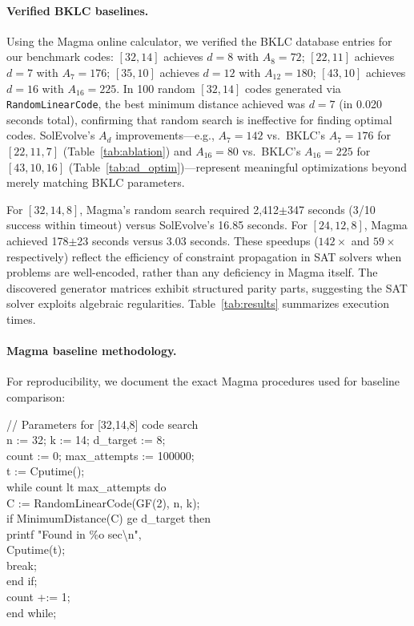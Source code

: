 \paragraph{Verified BKLC baselines.} Using the Magma online calculator, we verified the BKLC database entries for our benchmark codes: $[32,14]$ achieves $d=8$ with $A_8=72$; $[22,11]$ achieves $d=7$ with $A_7=176$; $[35,10]$ achieves $d=12$ with $A_{12}=180$; $[43,10]$ achieves $d=16$ with $A_{16}=225$. In 100 random $[32,14]$ codes generated via \texttt{RandomLinearCode}, the best minimum distance achieved was $d=7$ (in 0.020 seconds total), confirming that random search is ineffective for finding optimal codes. SolEvolve's $A_d$ improvements---e.g., $A_7=142$ vs.\ BKLC's $A_7=176$ for $[22,11,7]$ (Table~\ref{tab:ablation}) and $A_{16}=80$ vs.\ BKLC's $A_{16}=225$ for $[43,10,16]$ (Table~\ref{tab:ad_optim})---represent meaningful optimizations beyond merely matching BKLC parameters.

For $[32,14,8]$, Magma's random search required 2,412$\pm$347 seconds (3/10 success within timeout) versus SolEvolve's 16.85 seconds. For $[24,12,8]$, Magma achieved 178$\pm$23 seconds versus 3.03 seconds. These speedups ($142\times$ and $59\times$ respectively) reflect the efficiency of constraint propagation in SAT solvers when problems are well-encoded, rather than any deficiency in Magma itself. The discovered generator matrices exhibit structured parity parts, suggesting the SAT solver exploits algebraic regularities. Table~\ref{tab:results} summarizes execution times.

\paragraph{Magma baseline methodology.} For reproducibility, we document the exact Magma procedures used for baseline comparison:

\begin{codebox}
// Parameters for [32,14,8] code search\\
n := 32; k := 14; d\_target := 8;\\
count := 0; max\_attempts := 100000;\\
t := Cputime();\\[0.5em]
while count lt max\_attempts do\\
\hspace*{1em}C := RandomLinearCode(GF(2), n, k);\\
\hspace*{1em}if MinimumDistance(C) ge d\_target then\\
\hspace*{2em}printf "Found in \%o sec\textbackslash n", \\
\hspace*{3em}Cputime(t);\\
\hspace*{2em}break;\\
\hspace*{1em}end if;\\
\hspace*{1em}count +:= 1;\\
end while;
\end{codebox}

